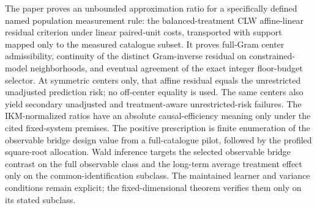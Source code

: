 The paper proves an unbounded approximation ratio for a specifically defined named population measurement rule: the balanced-treatment CLW affine-linear residual criterion under linear paired-unit costs, transported with support mapped only to the measured catalogue subset. It proves full-Gram center admissibility, continuity of the distinct Gram-inverse residual on constrained-model neighborhoods, and eventual agreement of the exact integer floor-budget selector. At symmetric centers only, that affine residual equals the unrestricted unadjusted prediction risk; no off-center equality is used. The same centers also yield secondary unadjusted and treatment-aware unrestricted-risk failures. The IKM-normalized ratios have an absolute causal-efficiency meaning only under the cited fixed-system premises. The positive prescription is finite enumeration of the observable bridge design value from a full-catalogue pilot, followed by the profiled square-root allocation. Wald inference targets the selected observable bridge contrast on the full observable class and the long-term average treatment effect only on the common-identification subclass. The maintained learner and variance conditions remain explicit; the fixed-dimensional theorem verifies them only on its stated subclass.